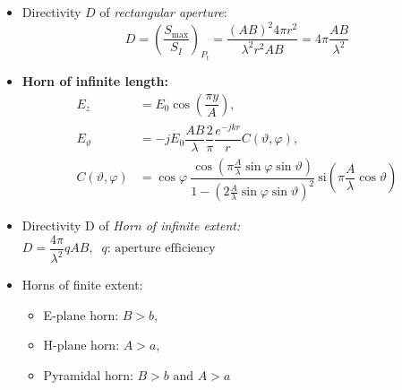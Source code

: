 \begin{itemize}
\begin{align*}
            &\dfrac{\vartheta^\prime_{\SI{3}{dB}}}{\mathrm{deg}} \approx 50.4 \dfrac{\lambda}{B}
        \end{align*}
            \(\implies \text{Side-lobe: } a_{SL} = 20 \log \dfrac{1}{0.21} \approx \SI{13.6}{dB}\)
    \item Directivity $D$ of \textit{rectangular aperture}:
        \begin{equation*}
            D = \left(\dfrac{S_{\mathrm{max}}}{S_I}\right)_{P_t} = \dfrac{(AB)^2 4\pi r^2}{\lambda^2 r^2 AB} = 4\pi \dfrac{AB}{\lambda^2}
        \end{equation*}
    \item \textbf{Horn of infinite length:}
        \begin{align*}
            E_z &= E_0 \cos\left(\dfrac{\pi y}{A}\right),\\
            E_{\vartheta} &= -jE_0 \dfrac{AB}{\lambda} \dfrac{2}{\pi} \dfrac{e^{-jkr}}{r} C(\vartheta, \varphi),\\
            C(\vartheta, \varphi) &= \cos\varphi\
            \dfrac{\cos\left(\pi \frac{A}{\lambda}\sin\varphi\sin\vartheta\right)}{1 - \left(2 \frac{A}{\lambda}\sin\varphi\sin\vartheta\right)^2}\
            \mathrm{si}\left(\pi \dfrac{A}{\lambda}\cos\vartheta\right)
        \end{align*}
    \item Directivity D of \textit{Horn of infinite extent:}\\
        \(D = \dfrac{4\pi}{\lambda^2}qAB,\;\;q \text{: aperture efficiency}\)
    \item Horns of finite extent:
        \begin{itemize}
            \itemsep0pt
            \item E-plane horn: \(B>b\),
            \item H-plane horn: \(A>a\),
            \item Pyramidal horn: \(B>b \text{ and  } A>a\)
        \end{itemize}
\end{itemize}


